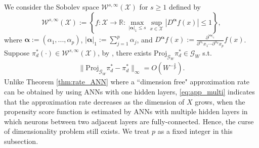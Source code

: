 \documentclass[11pt]{article}
\numberwithin{equation}{section}
\begin{document}
We consider the Sobolev space $\mathcal{W}^{s,\infty }(\mathcal{X})$ for $s\geq 1$ defined by \citet[Section 3.2]{yarotsky2017error}
\begin{equation*}
	\mathcal{W}^{s,\infty }(\mathcal{X}):=\left\{ f:\mathcal{X}\rightarrow
	\mathbb{R}:\max_{|\boldsymbol{\alpha }|_{1}\leq s}\sup_{x\in \mathcal{X}%
	}\left\vert D^{\boldsymbol{\alpha }}f(x)\right\vert \leq 1\right\} ,
\end{equation*}%
where $\boldsymbol{\alpha }:=(\alpha _{1},...,\alpha _{p})$,  $|\boldsymbol{\alpha }|_{1}:=\sum_{j=1}^{p}\alpha _{j}$, and $D^{\boldsymbol{\alpha }}f(x):=\frac{\partial^{|\boldsymbol{\alpha }|_{1}}}{\partial ^{\alpha_{1}}x_{1}\cdots \partial ^{\alpha _{p}}x_{p}}f(x)$.  Suppose $\pi_{d}^{\ast }(\cdot )\in \mathcal{W}^{s,\infty }(\mathcal{X})$, by \citet[Proposition 1]{yarotsky2018optimal}, there exists $\text{Proj}_{\mathcal{G}_{W}}\pi _{d}^{\ast }\in \mathcal{G}_{W}$ s.t.
\begin{align}\label{eq:app_multi}
	\|\text{Proj}_{\mathcal{G}_W}\pi_d^*-\pi_d^*\|_{\infty} =O\left(W^{-\frac{s}{p}}\right).
\end{align}
Unlike Theorem \ref{thm:rate_ANN} where a ``dimension free" approximation rate can be obtained by using ANNs with one hidden layers, \eqref{eq:app_multi} indicates that the approximation rate decreases as the dimension of $X$ grows, when the propensity score function is estimated by ANNs with multiple hidden layers in which neurons between two adjacent layers are fully-connected. Hence, the curse of dimensionality problem still exists.  We treat $p$ as a fixed integer in this subsection.
\end{document}
